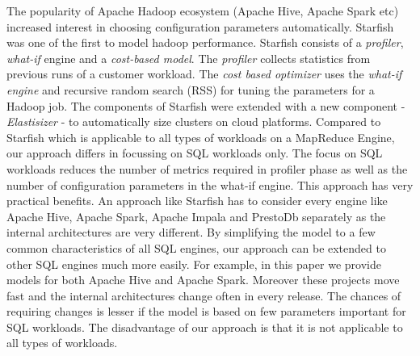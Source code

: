 The popularity of Apache Hadoop ecosystem (Apache Hive, Apache Spark etc) increased interest
in choosing configuration parameters automatically. 
Starfish \cite{herodotou2011starfish} was one of the first to model hadoop performance. Starfish 
consists of a \textit{profiler}, \textit{what-if} engine and a \textit{cost-based model}\cite{herodotou2011profiling}. 
The \textit{profiler} collects statistics from previous runs of a customer workload.
 The \textit{cost based optimizer} uses the \textit{what-if engine}
and recursive random search (RSS) for tuning the parameters for a Hadoop job. The components of
Starfish were extended with a new component - \textit{Elastisizer}\cite{HerodotouNoOne}
- to automatically size clusters on cloud platforms. 
Compared to Starfish which is applicable to all types of workloads on a MapReduce Engine, our approach differs in focussing on SQL workloads only. The focus on 
SQL workloads reduces the number of metrics required in profiler phase as well as the number of configuration parameters in the what-if engine.
This approach has very practical benefits. An approach like Starfish has to consider every engine like Apache Hive, Apache Spark, Apache Impala and PrestoDb separately
as the internal architectures are very different. By simplifying the model to a few common characteristics of all SQL engines, our approach can be extended
to other SQL engines much more easily. For example, in this paper we provide models for both Apache Hive and Apache Spark. Moreover these projects move 
fast and the internal architectures change often in every release. The chances of requiring changes is lesser if the model is based on few parameters important for SQL workloads.
The disadvantage of our approach is that it is not applicable to all types of workloads. 


